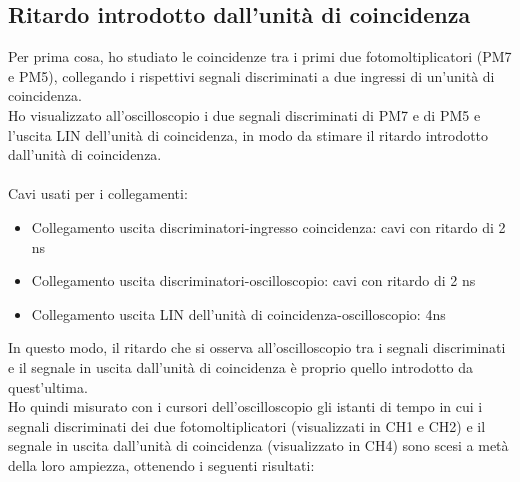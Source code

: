 \documentclass{article}
\begin{document}
\subsection{Ritardo introdotto dall'unità di coincidenza}
Per prima cosa, ho studiato le coincidenze tra i primi due fotomoltiplicatori (PM7 e PM5), collegando i rispettivi segnali discriminati a due ingressi di un'unità di coincidenza.\\
Ho visualizzato all'oscilloscopio i due segnali discriminati di PM7 e di PM5 e l'uscita LIN dell'unità di coincidenza, in modo da stimare il ritardo introdotto dall'unità di coincidenza. 
\\
\\
Cavi usati per i collegamenti: 
\begin{itemize}
    \item Collegamento uscita discriminatori-ingresso coincidenza: cavi con ritardo di 2 ns
    \item Collegamento uscita discriminatori-oscilloscopio: cavi con ritardo di 2 ns
     \item Collegamento uscita LIN dell'unità di coincidenza-oscilloscopio: 4ns
\end{itemize}
In questo modo, il ritardo che si osserva all'oscilloscopio tra i segnali discriminati e il segnale in uscita dall'unità di coincidenza è proprio quello introdotto da quest'ultima. 
\\
Ho quindi misurato con i cursori dell'oscilloscopio gli istanti di tempo in cui i segnali discriminati dei due fotomoltiplicatori (visualizzati in CH1 e CH2) e il segnale in uscita dall'unità di coincidenza (visualizzato in CH4) sono scesi a metà della loro ampiezza, ottenendo i seguenti risultati: 
\end{document}
